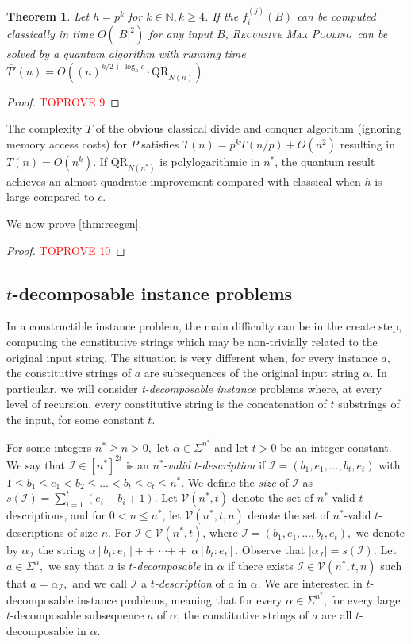 \documentclass[12pt]{article}
\newcommand{\qr}{\mathrm{QR}}
\newcommand{\concat}{\ensuremath{+\!\!\!\!+\,}}
\newcommand{\RMP}{\textsc{Recursive Max Pooling}}
\newtheorem{theorem}{Theorem}
\theoremstyle{definition}
\begin{document}
\begin{theorem}
    Let $h = p^k$ for $k\in\mathbb{N}, k\ge 4$. If the $f^{(j)}_i(B)$ can be computed classically in time $O(|B|^2)$ for any input $B$, \RMP\ can be solved by a quantum algorithm with running time $\overline{T'}(n) = O((n)^{k/2 + \log_hc}\cdot \qr_{N(n)})$.
\end{theorem}

\begin{proof}\textcolor{red}{TOPROVE 9}\end{proof}
The complexity $T$ of the obvious classical divide and conquer algorithm (ignoring memory access costs) for $P$ satisfies $T(n) = p^k T(n/p) + O(n^2)$ resulting in $T(n) = O(n^k)$. 
If $\qr_{N(n^*)}$ is polylogarithmic in  $n^*$, the quantum result achieves an almost quadratic improvement compared with classical when $h$ is large compared to $c$. 

We now prove \cref{thm:recgen}.
\begin{proof}\textcolor{red}{TOPROVE 10}\end{proof}

\subsection{$t$-decomposable instance problems} 
\label{subsec:self-reducible}

In a constructible instance problem, the main difficulty can be in the create step, computing the constitutive strings which may be non-trivially related to the original input string. The situation is very different when, for every instance $a$, the constitutive strings of $a$ are subsequences of the original input string $\alpha$. In particular, we will consider \emph{t-decomposable instance} problems where, at every level of recursion, every constitutive string is the concatenation of $t$ substrings of the input, for some constant $t$.


For some integers ${n^*} \geq n > 0,$ let $\alpha \in \Sigma^{n^*}$ and let $t > 0$ be an integer constant.
We say that $\mathcal{I} \in [n^*]^{2t}$ is an $n^*$-{\em valid} $t$-{\em description}  if $\mathcal{I} = (b_1, e_1, \ldots, b_t, e_t)$ with $1\leq b_1 \leq e_1 < b_2 \leq  \ldots  < b_t \leq e_t \leq {n^*}$.
We define the {\em size} of $\mathcal{I}$ as $s(\mathcal{I}) = \sum_{i=1}^t (e_i - b_i +1)$.
Let $\mathcal{V}(n^*,t)$ denote the set of $n^*$-{valid} $t$-descriptions, and for $0 < n \leq n^*$, let $\mathcal{V}(n^*,t,n)$ denote the set of $n^*$-{valid} $t$-descriptions of size $n$.
For $\mathcal{I} \in  \mathcal{V}(n^*,t)$, where $\mathcal{I} = (b_1, e_1, \ldots, b_t, e_t),$ we denote by $\alpha_{\mathcal{I}}$ the string $\alpha[b_1:e_1]\concat \cdots \concat \alpha[b_t:e_t]$.
Observe that $|\alpha_{\mathcal{I}}| = s(\mathcal{I}).$
Let $a \in \Sigma^n,$ we say that $a$ is {\em $t$-decomposable} in $\alpha$ if there exists $\mathcal{I} \in  \mathcal{V}(n^*,t, n)$ such that $a = \alpha_{\mathcal{I}},$ and we call $\mathcal{I}$ a {\em $t$-description} of $a$ in $\alpha$. 
We are interested in $t$-decomposable instance problems, meaning that for every $\alpha \in \Sigma^{n^*}$, for every large $t$-decomposable subsequence $a$ of $\alpha$, the constitutive strings of $a$ are all $t$-decomposable in $\alpha$.
\end{document}
